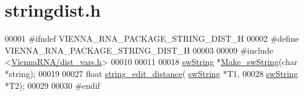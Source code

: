 \hypertarget{stringdist_8h_source}{\section{stringdist.\+h}
\label{stringdist_8h_source}
}

\begin{DoxyCode}
00001 \textcolor{preprocessor}{#ifndef VIENNA\_RNA\_PACKAGE\_STRING\_DIST\_H}
00002 \textcolor{preprocessor}{#define VIENNA\_RNA\_PACKAGE\_STRING\_DIST\_H}
00003 
00009 \textcolor{preprocessor}{#include <\hyperlink{dist__vars_8h}{ViennaRNA/dist\_vars.h}>}
00010 
00011 
00018 \hyperlink{structswString}{swString} *\hyperlink{stringdist_8h_a3125991b3a403b3f89230474deb3f22e}{Make\_swString}(\textcolor{keywordtype}{char} *\textcolor{keywordtype}{string});
00019 
00027 \textcolor{keywordtype}{float}     \hyperlink{stringdist_8h_a89e3c335ef17780576d7c0e713830db9}{string\_edit\_distance}( \hyperlink{structswString}{swString} *T1,
00028                                 \hyperlink{structswString}{swString} *T2);
00029 
00030 \textcolor{preprocessor}{#endif}
\end{DoxyCode}
